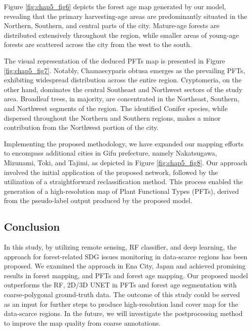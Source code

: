 Figure \ref{fig:chap5_fig6} depicts the forest age map generated by our model, revealing that the primary harvesting-age areas are predominantly situated in the Northern, Southern, and central parts of the city. Mature-age forests are distributed extensively throughout the region, while smaller areas of young-age forests are scattered across the city from the west to the south. \par

The visual representation of the deduced PFTs map is presented in Figure \ref{fig:chap5_fig7}. Notably, Chamaecyparis obtusa emerges as the prevailing PFTs, exhibiting widespread distribution across the entire region. Cryptomeria, on the other hand, dominates the central Southeast and Northwest sectors of the study area. Broadleaf trees, in majority, are concentrated in the Northeast, Southern, and Northwest segments of the region. The identified Conifer species, while dispersed throughout the Northern and Southern regions, makes a minor contribution from the Northwest portion of the city. \par

Implementing the proposed methodology, we have expanded our mapping efforts to encompass additional cities in Gifu prefecture, namely Nakatsugawa, Mizunami, Toki, and Tajimi, as depicted in Figure \ref{fig:chap5_fig8}. Our approach involved the initial application of the proposed network, followed by the utilization of a straightforward reclassification method. This process enabled the generation of a high-resolution map of Plant Functional Types (PFTs), derived from the pseudo-label output produced by the proposed model.\par

\subsection{Conclusion} \label{chap5_conclusion}
In this study, by utilizing remote sensing, RF classifier, and deep learning, the approach for forest-related SDG issues monitoring in data-scarce regions has been proposed. We examined the approach in Ena City, Japan and achieved promising results in forest mapping, and PFTs and forest age mapping. Our proposed model outperforms the RF, 2D/3D UNET in PFTs and forest age segmentation with coarse-polygonal ground-truth data. The outcome of this study could be served as an input for further steps to produce high-resolution land cover map for the data-scarce regions. In the future, we will investigate the postprocessing method to improve the map quality from coarse annotations.